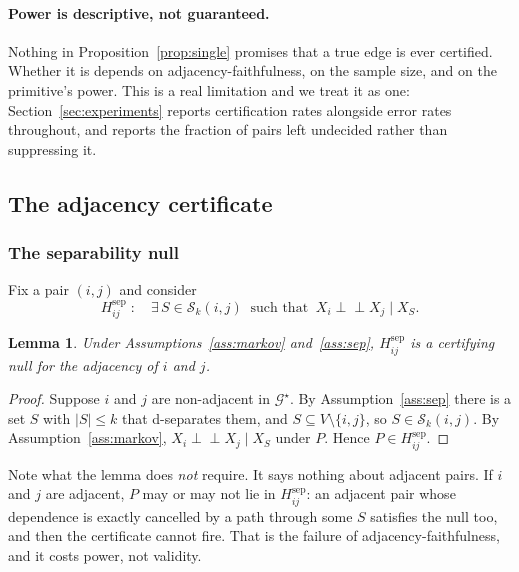 \documentclass[pdflatex,sn-apa]{sn-jnl}
\theoremstyle{thmstyleone}%
\newtheorem{lemma}[theorem]{Lemma}%
\theoremstyle{thmstyletwo}%
\theoremstyle{thmstylethree}%
\newcommand{\indep}{\perp\!\!\!\perp}
\newcommand{\Scal}{\mathcal{S}}
\newcommand{\Gstar}{\mathcal{G}^{\star}}
\begin{document}
\paragraph{Power is descriptive, not guaranteed.} Nothing in
Proposition~\ref{prop:single} promises that a true edge is ever certified.
Whether it is depends on adjacency-faithfulness, on the sample size, and on
the primitive's power. This is a real limitation and we treat it as one:
Section~\ref{sec:experiments} reports certification rates alongside error
rates throughout, and reports the fraction of pairs left undecided rather than
suppressing it.

\subsection{The adjacency certificate}\label{sec:adjacency}

\subsubsection{The separability null}\label{sec:sepnull}

Fix a pair $(i,j)$ and consider
\begin{equation}\label{eq:sepnull}
H^{\mathrm{sep}}_{ij} \;:\quad
\exists\, S \in \Scal_k(i,j) \ \text{ such that } \ X_i \indep X_j \mid X_S .
\end{equation}

\begin{lemma}\label{lem:certifying}
Under Assumptions~\ref{ass:markov} and~\ref{ass:sep},
$H^{\mathrm{sep}}_{ij}$ is a certifying null for the adjacency of $i$ and $j$.
\end{lemma}

\begin{proof}
Suppose $i$ and $j$ are non-adjacent in $\Gstar$. By
Assumption~\ref{ass:sep} there is a set $S$ with $|S| \le k$ that d-separates
them, and $S \subseteq V \setminus \{i,j\}$, so $S \in \Scal_k(i,j)$. By
Assumption~\ref{ass:markov}, $X_i \indep X_j \mid X_S$ under $P$. Hence
$P \in H^{\mathrm{sep}}_{ij}$.
\end{proof}

Note what the lemma does \emph{not} require. It says nothing about adjacent
pairs. If $i$ and $j$ are adjacent, $P$ may or may not lie in
$H^{\mathrm{sep}}_{ij}$: an adjacent pair whose dependence is exactly
cancelled by a path through some $S$ satisfies the null too, and then the
certificate cannot fire. That is the failure of adjacency-faithfulness, and it
costs power, not validity.
\end{document}
